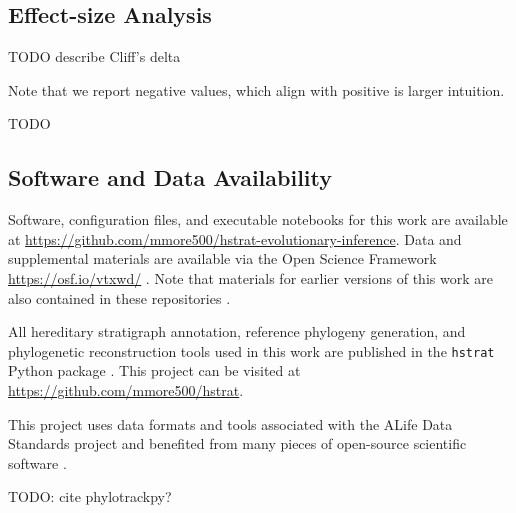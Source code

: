 \subsection{Effect-size Analysis}

TODO describe Cliff's delta
\citep{meissel2024using}

Note that we report negative values, which align with positive is larger intuition.

TODO \citep{mann1947on}

\subsection{Software and Data Availability}

Software, configuration files, and executable notebooks for this work are available at \url{https://github.com/mmore500/hstrat-evolutionary-inference}.
Data and supplemental materials are available via the Open Science Framework \url{https://osf.io/vtxwd/} \citep{foster2017open}.
Note that materials for earlier versions of this work are also contained in these repositories \citep{moreno2023toward}.

All hereditary stratigraph annotation, reference phylogeny generation, and phylogenetic reconstruction tools used in this work are published in the \texttt{hstrat} Python package \citep{moreno2022hstrat}.
This project can be visited at \url{https://github.com/mmore500/hstrat}.

This project uses data formats and tools associated with the ALife Data Standards project \citep{lalejini2019data} and benefited from many pieces of open-source scientific software \citep{ofria2020empirical,sand2014tqdist,2020SciPy-NMeth,harris2020array,reback2020pandas,mckinney-proc-scipy-2010,sukumaran2010dendropy,cock2009biopython,torchiano2016effsize,waskom2021seaborn,hunter2007matplotlib,moreno2024apc,moreno2024qspool,moreno2023teeplot,hagen2021gen3sis,ofria2004avida,torchiano2016effsize}.

TODO: cite phylotrackpy?
